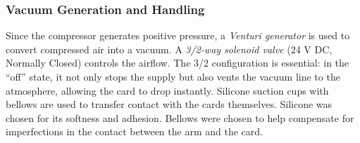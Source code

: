 \subsubsection{Vacuum Generation and Handling}
Since the compressor generates positive pressure, a \textit{Venturi generator} is used to convert compressed air into a 
vacuum. A \textit{3/2-way solenoid valve} (24 V DC, Normally Closed) controls the airflow. The 3/2 configuration is 
essential: in the \enquote{off} state, it not only stops the supply but also vents the vacuum line to the atmosphere,
allowing the card to drop instantly. Silicone suction cups with bellows are used to transfer contact with the cards 
themselves. Silicone was chosen for its softness and adhesion. Bellows were chosen to help compensate for imperfections 
in the contact between the arm and the card.

